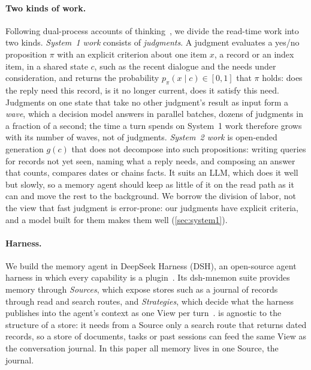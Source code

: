 \paragraph{Two kinds of work.}
Following dual-process accounts of thinking~\citep{kahneman2011thinking}, we divide the read-time work into two kinds.
\emph{System~1 work} consists of \emph{judgments}.
A judgment evaluates a yes/no proposition $\pi$ with an explicit criterion about one item $x$, a record or an index item, in a shared state $c$, such as the recent dialogue and the needs under consideration, and returns the probability $p_\pi(x \mid c) \in [0, 1]$ that $\pi$ holds: does the reply need this record, is it no longer current, does it satisfy this need.
Judgments on one state that take no other judgment's result as input form a \emph{wave}, which a decision model answers in parallel batches, dozens of judgments in a fraction of a second; the time a turn spends on System~1 work therefore grows with its number of waves, not of judgments.
\emph{System~2 work} is open-ended generation $g(c)$ that does not decompose into such propositions: writing queries for records not yet seen, naming what a reply needs, and composing an answer that counts, compares dates or chains facts.
It suits an LLM, which does it well but slowly, so a memory agent should keep as little of it on the read path as it can and move the rest to the background.
We borrow the division of labor, not the view that fast judgment is error-prone: our judgments have explicit criteria, and a model built for them makes them well (\cref{sec:system1}).

\paragraph{Harness.}
We build the memory agent in DeepSeek Harness (DSH), an open-source agent harness in which every capability is a plugin~\citep{dsh2026}.
Its dsh-mnemon suite provides memory through \emph{Sources}, which expose stores such as a journal of records through read and search routes, and \emph{Strategies}, which decide what the harness publishes into the agent's context as one View per turn~\citep{mnemon2026code}.
\sys{} is agnostic to the structure of a store: it needs from a Source only a search route that returns dated records, so a store of documents, tasks or past sessions can feed the same View as the conversation journal.
In this paper all memory lives in one Source, the journal.

